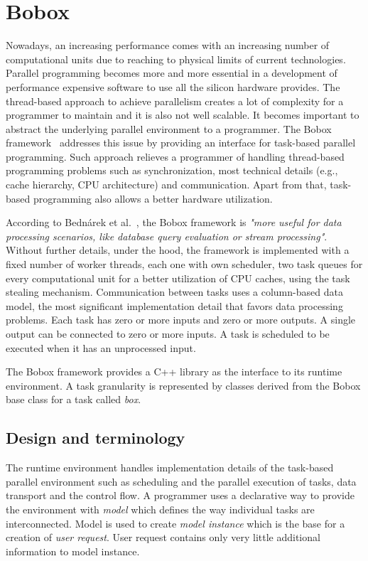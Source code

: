 \chapter{Bobox}
Nowadays, an increasing performance comes with an increasing number of computational units due to reaching to physical limits of current technologies. Parallel programming becomes more and more essential in a development of performance expensive software to use all the silicon hardware provides. The thread-based approach to achieve parallelism creates a lot of complexity for a programmer to maintain and it is also not well scalable. It becomes important to abstract the underlying parallel environment to a programmer. The Bobox framework~\cite{bobox-4, bobox} addresses this issue by providing an interface for task-based parallel programming. Such approach relieves a programmer of handling thread-based programming problems such as synchronization, most technical details (e.g., cache hierarchy, CPU architecture) and communication. Apart from that, task-based programming also allows a better hardware utilization.

According to Bednárek et al.~\cite{bobox-1}, the Bobox framework is \textit{"more useful for data processing scenarios, like database query evaluation or stream processing"}. Without further details, under the hood, the framework is implemented with a fixed number of worker threads, each one with own scheduler, two task queues for every computational unit for a better utilization of CPU caches, using the task stealing mechanism. Communication between tasks uses a column-based data model, the most significant implementation detail that favors data processing problems. Each task has zero or more inputs and zero or more outputs. A single output can be connected to zero or more inputs. A task is scheduled to be executed when it has an unprocessed input.

The Bobox framework provides a C++ library as the interface to its runtime environment. A task granularity is represented by classes derived from the Bobox base class for a task called \emph{box}.

\section{Design and terminology}
\label{bobox-terminology}
The runtime environment handles implementation details of the task-based parallel environment such as scheduling and the parallel execution of tasks, data transport and the control flow. A programmer uses a declarative way to provide the environment with \emph{model} which defines the way individual tasks are interconnected. Model is used to create \emph{model instance} which is the base for a creation of \emph{user request}. User request contains only very little additional information to model instance.

